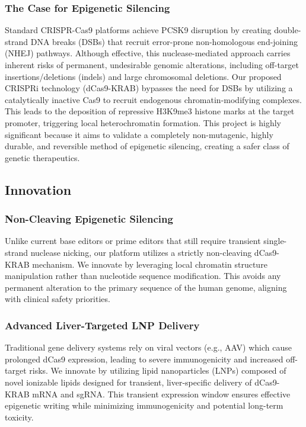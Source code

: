 \documentclass[11pt]{article}
\newcommand{\p}{\vspace{1.5mm}}
\begin{document}
\subsubsection{The Case for Epigenetic Silencing}
Standard CRISPR-Cas9 platforms achieve PCSK9 disruption by creating double-strand DNA breaks (DSBs) that recruit error-prone non-homologous end-joining (NHEJ) pathways. Although effective, this nuclease-mediated approach carries inherent risks of permanent, undesirable genomic alterations, including off-target insertions/deletions (indels) and large chromosomal deletions. Our proposed CRISPRi technology (dCas9-KRAB) bypasses the need for DSBs by utilizing a catalytically inactive Cas9 to recruit endogenous chromatin-modifying complexes. This leads to the deposition of repressive H3K9me3 histone marks at the target promoter, triggering local heterochromatin formation. This project is highly significant because it aims to validate a completely non-mutagenic, highly durable, and reversible method of epigenetic silencing, creating a safer class of genetic therapeutics.

\p
\subsection{Innovation}
\subsubsection{Non-Cleaving Epigenetic Silencing}
Unlike current base editors or prime editors that still require transient single-strand nuclease nicking, our platform utilizes a strictly non-cleaving dCas9-KRAB mechanism. We innovate by leveraging local chromatin structure manipulation rather than nucleotide sequence modification. This avoids any permanent alteration to the primary sequence of the human genome, aligning with clinical safety priorities.

\p
\subsubsection{Advanced Liver-Targeted LNP Delivery}
Traditional gene delivery systems rely on viral vectors (e.g., AAV) which cause prolonged dCas9 expression, leading to severe immunogenicity and increased off-target risks. We innovate by utilizing lipid nanoparticles (LNPs) composed of novel ionizable lipids designed for transient, liver-specific delivery of dCas9-KRAB mRNA and sgRNA. This transient expression window ensures effective epigenetic writing while minimizing immunogenicity and potential long-term toxicity.
\end{document}
